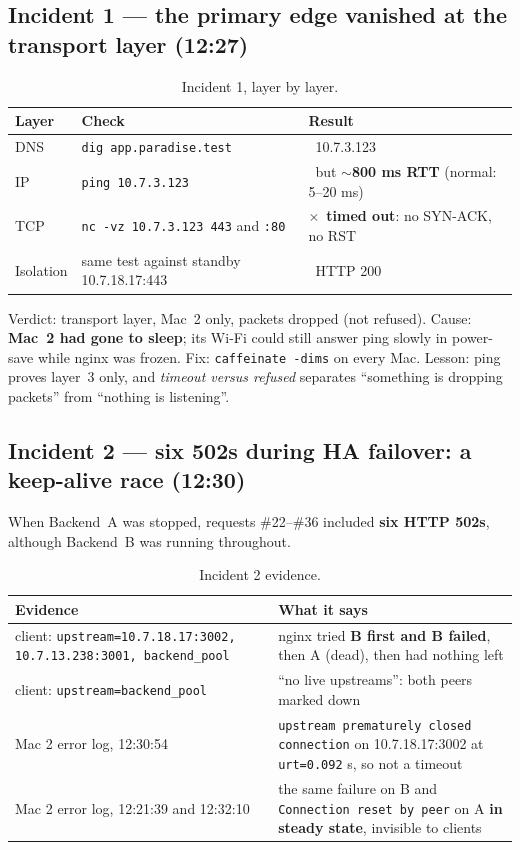 \documentclass[11pt,a4paper]{article}
\newcommand{\ok}{\textcolor{lmGreen}{\checkmark}}
\newcommand{\bad}{\textcolor{lmRed}{$\times$}}
\begin{document}
\subsection{Incident 1 --- the primary edge vanished at the transport layer (12:27)}
\begin{table}[H]
\centering
\caption{Incident 1, layer by layer.}
{\small
\begin{tabular}{@{}L{2.0cm}L{6.0cm}L{6.2cm}@{}}
\toprule
\textbf{Layer} & \textbf{Check} & \textbf{Result} \\
\midrule
DNS & \texttt{dig app.paradise.test} & \ok\ 10.7.3.123 \\
IP & \texttt{ping 10.7.3.123} & \ok\ but $\sim$\textbf{800 ms RTT} (normal: 5--20 ms) \\
TCP & \texttt{nc -vz 10.7.3.123 443} and \texttt{:80} & \bad\ \textbf{timed out}: no SYN-ACK, no RST \\
Isolation & same test against standby 10.7.18.17:443 & \ok\ HTTP 200 \\
\bottomrule
\end{tabular}}
\end{table}
Verdict: transport layer, Mac~2 only, packets dropped (not refused). Cause: \textbf{Mac~2 had gone to
sleep}; its Wi-Fi could still answer ping slowly in power-save while nginx was frozen. Fix:
\texttt{caffeinate -dims} on every Mac. Lesson: ping proves layer~3 only, and \emph{timeout versus
refused} separates ``something is dropping packets'' from ``nothing is listening''.

\subsection{Incident 2 --- six 502s during HA failover: a keep-alive race (12:30)}
When Backend~A was stopped, requests \#22--\#36 included \textbf{six HTTP 502s}, although Backend~B
was running throughout.

\begin{table}[H]
\centering
\caption{Incident 2 evidence.}
{\small
\begin{tabular}{@{}L{5.6cm}L{8.6cm}@{}}
\toprule
\textbf{Evidence} & \textbf{What it says} \\
\midrule
client: \texttt{upstream=10.7.18.17:3002, 10.7.13.238:3001, backend\_pool} & nginx tried \textbf{B first and B failed}, then A (dead), then had nothing left \\
client: \texttt{upstream=backend\_pool} & ``no live upstreams'': both peers marked down \\
Mac 2 error log, 12:30:54 & \texttt{upstream prematurely closed connection} on 10.7.18.17:3002 at \texttt{urt=0.092} s, so not a timeout \\
Mac 2 error log, 12:21:39 and 12:32:10 & the same failure on B and \texttt{Connection reset by peer} on A \textbf{in steady state}, invisible to clients \\
\bottomrule
\end{tabular}}
\end{table}
\end{document}
